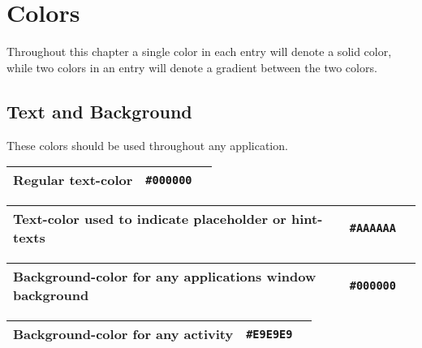 
\chapter{Colors}
Throughout this chapter a single color in each entry will denote a solid color, while two colors in an entry will denote a gradient between the two colors.


\section{Text and Background}
These colors should be used throughout any application.

\begin{table}[!htbp]
	\begin{tabularx}{\textwidth}{X r c}
		Regular text-color 
		& \texttt{\#000000} & \cellcolor[HTML]{000000}\phantom{--} \\ \hline
	\end{tabularx}
\end{table}

\begin{table}[!htbp]
	\begin{tabularx}{\textwidth}{X r c}
		Text-color used to indicate placeholder or hint-texts 
		& \texttt{\#AAAAAA} & \cellcolor[HTML]{AAAAAA}\phantom{--} \\ \hline
	\end{tabularx}
\end{table}

\begin{table}[!htbp]
	\begin{tabularx}{\textwidth}{X r c}
		Background-color for any applications window background 
		& \texttt{\#000000} & \cellcolor[HTML]{000000}\phantom{--} \\ \hline
	\end{tabularx}
\end{table}

\begin{table}[!htbp]
	\begin{tabularx}{\textwidth}{X r c}
		Background-color for any activity 
		& \texttt{\#E9E9E9} & \cellcolor[HTML]{E9E9E9}\phantom{--} \\ \hline
	\end{tabularx}
\end{table}

